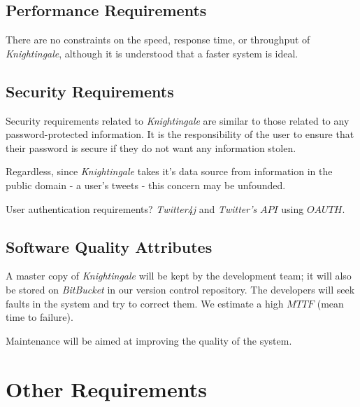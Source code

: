 \documentclass[a4paper, 12pt]{article}
\begin{document}
\subsection{Performance Requirements} \label{sec:performance}
\begin{adjustwidth}{2em}{0pt}
There are no constraints on the speed, response time, or throughput of \textit{Knightingale}, although it is understood that a faster system is ideal.
\end{adjustwidth}

\subsection{Security Requirements} \label{sec:security}
\begin{adjustwidth}{2em}{0pt}
Security requirements related to \textit{Knightingale} are similar to those related to any password-protected information. It is the responsibility of the user to ensure that their password is secure if they do not want any information stolen. \newline

\noindent Regardless, since \textit{Knightingale} takes it’s data source from information in the public domain - a user’s tweets - this concern may be unfounded. \newline

\noindent User authentication requirements? \newline
\noindent \textit{Twitter4j} and \textit{Twitter’s} $API$ using $OAUTH$.
\end{adjustwidth} 

\subsection{Software Quality Attributes} \label{sec:quality}
\begin{adjustwidth}{2em}{0pt}
A master copy of \textit{Knightingale} will be kept by the development team; it will also be stored on \textit{BitBucket} in our version control repository. The developers will seek faults in the system and try to correct them. We estimate a high $MTTF$ (mean time to failure). \newline

\noindent Maintenance will be aimed at improving the quality of the system. 
\end{adjustwidth}

\section{Other Requirements} \label{sec:other}
\end{document}
